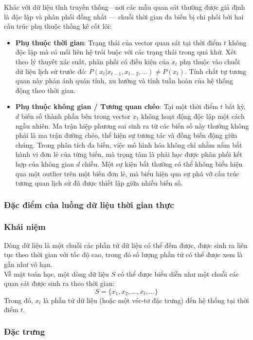     Khác với dữ liệu tĩnh truyền thống—nơi các mẫu quan sát thường được giả định là độc lập và phân phối đồng nhất — chuỗi thời gian đa biến bị chi phối bởi hai cấu trúc phụ thuộc thống kê cốt lõi:
    \begin{itemize}[label=--]
        \item \textbf{Phụ thuộc thời gian}: Trạng thái của vector quan sát tại thời điểm $t$ không độc lập mà có mối liên hệ trói buộc với các trạng thái trong quá khứ. Xét theo lý thuyết xác suất, phân phối có điều kiện của $x_t$ phụ thuộc vào chuỗi dữ liệu lịch sử trước đó: $P(x_t | x_{t-1}, x_{t-2}, \dots) \neq P(x_t)$. Tính chất tự tương quan này phản ánh quán tính, xu hướng và tính tuần hoàn của hệ thống động theo thời gian.
        \item \textbf{Phụ thuộc không gian / Tương quan chéo}: Tại một thời điểm $t$ bất kỳ, $d$ biến số thành phần bên trong vector $x_t$ không hoạt động độc lập một cách ngẫu nhiên. Ma trận hiệp phương sai sinh ra từ các biến số này thường không phải là ma trận đường chéo, thể hiện sự tương tác và đồng biến động giữa chúng. Trong phân tích đa biến, việc mô hình hóa không chỉ nhằm nắm bắt hành vi đơn lẻ của từng biến, mà trọng tâm là phải học được phân phối kết hợp  của không gian $d$ chiều. Một sự kiện bất thường có thể không biểu hiện qua một outlier trên một biến đơn lẻ, mà biểu hiện qua sự phá vỡ cấu trúc tương quan lịch sử đã được thiết lập giữa nhiều biến số.
    \end{itemize}
\subsubsection{Đặc điểm của luồng dữ liệu thời gian thực}
    \subsubsection*{Khái niệm}
    
    Dòng dữ liệu là một chuỗi các phần tử dữ liệu có thể đếm được, được sinh ra liên tục theo thời gian với tốc độ cao, trong đó số lượng phần tử có thể được xem là gần như vô hạn.\\%
    Về mặt toán học, một dòng dữ liệu $S$ có thể được biểu diễn như một chuỗi các quan sát được sinh ra theo thời gian:
    $$S = \{x_1, x_2, \dots, x_t, \dots\}$$
    Trong đó, $x_t$ là phần tử dữ liệu (hoặc một véc-tơ đặc trưng) đến hệ thống tại thời điểm $t$. 
    
    \subsubsection*{Đặc trưng}
    
